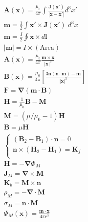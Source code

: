 \documentclass[10pt]{article}
\newcommand{\ve}[1]{\boldsymbol{\mathbf{#1}}}
\newcommand{\vect}[1]{\boldsymbol{\mathbf{#1}}}
\begin{document}
\begin{multicols}{2}
\begin{align*}
		& \vect{A}(\vect{x}) = \frac{\mu_0}{4 \pi} \int \frac{\vect{J}(\vect{x}')}{|\vect{x}-\vect{x}'|} d^3 x' \tag*{Magnetic vector potential of current distribution (5.32)} \\
		& \vect{m} = \frac{1}{2} \int \vect{x}' \times \vect{J}(\vect{x}') \; d^3 x \tag*{Magnetic moment definition (5.54)} \\
		& \vect{m} = \frac{I}{2} \oint \vect{x} \times d \vect{l} \tag*{Magnetic moment of closed circuit (J. pg. 186)} \\
		& |\vect{m}| = I \times (\text{Area}) \tag*{Magnetic moment of plane loop (5.57)} \\
		& \vect{A}(\vect{x}) = \frac{\mu_0}{4 \pi} \frac{\vect{m} \times \vect{x}}{|\vect{x}|^3} \tag*{Dipole vector potential (5.55)} \\
		& \vect{B}(\vect{x}) = \frac{\mu_0}{4 \pi} \left[ \frac{3 \vect{n}(\vect{n} \cdot \vect{m}) - \vect{m}}{|\vect{x}|^3} \right]\tag*{Dipole induction (5.56)}\\
		& \vect{F} = \vect{\nabla(m \cdot B)} \tag*{Force on dipole (5.69)} \\
		& \vect{H} = \frac{1}{\mu_0} \vect{B - M} \tag*{Magnetic field (5.81)} \\
		& \ve{M} = (\mu / \mu_0 - 1) \ve{H} \tag*{Magnetization in linear media (G. 6.29)} \\
		& \vect{B} = \mu \vect{H} \tag*{Linear condition (5.84)} \\
		&\begin{cases}
			(\vect{B}_2 - \vect{B}_1) \cdot \vect{n} = 0 \\
			\vect{n} \times (\vect{H}_2 - \vect{H}_1) = \vect{K}_f \\ 
		\end{cases} \tag*{Interface BC (5.86)} \\
		& \vect{H} = -\vect{\nabla} \Phi_M \tag*{Magnetic scalar potential (5.93)} \\
		& \vect{J}_M = \vect{\nabla \times M} \tag*{Bound volume current density (G. 6.13)} \\
		& \vect{K}_b = \vect{M \times n} \tag*{Bound surface current density (G. 6.14)} \\
		& \rho_M = - \vect{\nabla \cdot M} \tag*{Effective magnetic charge density (5.96)} \\
		& \sigma_M = \vect{n \cdot M} \tag*{Effective magnetic surface-charge density (5.99)} \\
		& \Phi_M(\vect{x}) = \frac{\vect{m \cdot x}}{4 \pi r^3} \tag*{Magnetic scalar potential of dipole (J. pg. 196)} \\

\end{align*}
\end{multicols}
\end{document}

